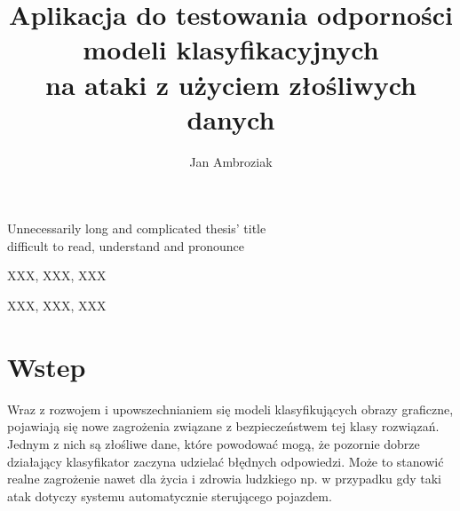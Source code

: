 \documentclass[
    left=2.5cm,         %
    right=2.5cm,        %
    top=2.5cm,          %
    bottom=3cm,         %
    bindingoffset=6mm,  %
    nohyphenation=false %
]{eiti/eiti-thesis}
\begin{document}
\EngineerThesis %
{}
\title
{
    Aplikacja do testowania odporności modeli klasyfikacyjnych \\
    na ataki z użyciem złośliwych danych \\
}

\engtitle
{ %
    Unnecessarily long and complicated thesis' title \\
    difficult to read, understand and pronounce
}

\author{Jan Ambroziak}
\date{\the\year}
\maketitle

\cleardoublepage %
\streszczenie \lipsum[1-3]
\slowakluczowe XXX, XXX, XXX

\newpage
\abstract \kant[1-3]
\keywords XXX, XXX, XXX

\cleardoublepage  %
\pagestyle{plain}
\makeauthorship

\cleardoublepage %
\tableofcontents

\cleardoublepage %
\pagestyle{headings}

\section{Wstep}






Wraz z rozwojem i upowszechnianiem się modeli klasyfikujących obrazy graficzne,
pojawiają się nowe zagrożenia związane z bezpieczeństwem tej klasy rozwiązań.
Jednym z nich są złośliwe dane, które powodować mogą,
że pozornie dobrze działający klasyfikator zaczyna udzielać błędnych odpowiedzi.
Może to stanowić realne zagrożenie nawet dla życia i zdrowia ludzkiego
np. w przypadku gdy taki atak dotyczy systemu automatycznie sterującego pojazdem.
\end{document}
